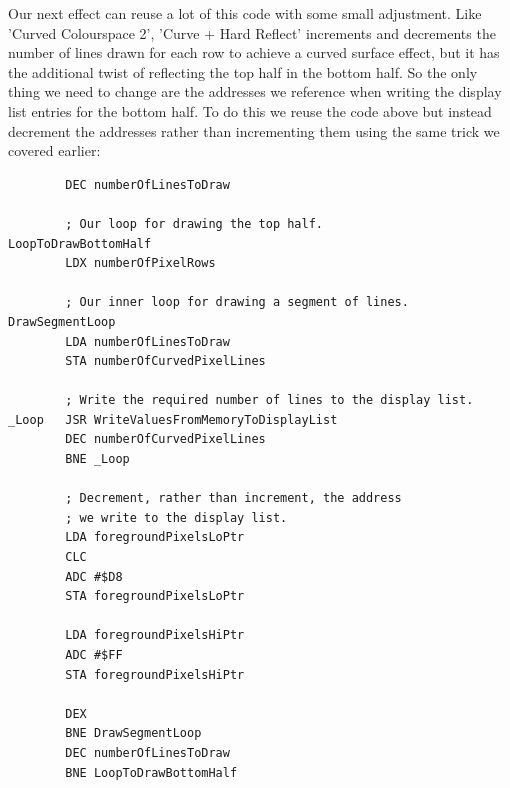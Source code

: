 Our next effect can reuse a lot of this code with some small adjustment. Like 'Curved Colourspace 2', 'Curve + Hard Reflect'
increments and decrements the number of lines drawn for each row to achieve a curved surface effect, but it has the additional
twist of reflecting the top half in the bottom half. So the only thing we need to change are the addresses we reference when
writing the display list entries for the bottom half. To do this we reuse the code above but instead decrement the addresses
rather than incrementing them using the same trick we covered earlier:

\begin{lstlisting}
        DEC numberOfLinesToDraw

        ; Our loop for drawing the top half.
LoopToDrawBottomHalf    
        LDX numberOfPixelRows

        ; Our inner loop for drawing a segment of lines.
DrawSegmentLoop   
        LDA numberOfLinesToDraw
        STA numberOfCurvedPixelLines

        ; Write the required number of lines to the display list.
_Loop   JSR WriteValuesFromMemoryToDisplayList
        DEC numberOfCurvedPixelLines
        BNE _Loop

        ; Decrement, rather than increment, the address
        ; we write to the display list.
        LDA foregroundPixelsLoPtr
        CLC 
        ADC #$D8
        STA foregroundPixelsLoPtr

        LDA foregroundPixelsHiPtr
        ADC #$FF
        STA foregroundPixelsHiPtr

        DEX 
        BNE DrawSegmentLoop
        DEC numberOfLinesToDraw
        BNE LoopToDrawBottomHalf

\end{lstlisting}
%
%
\clearpage
